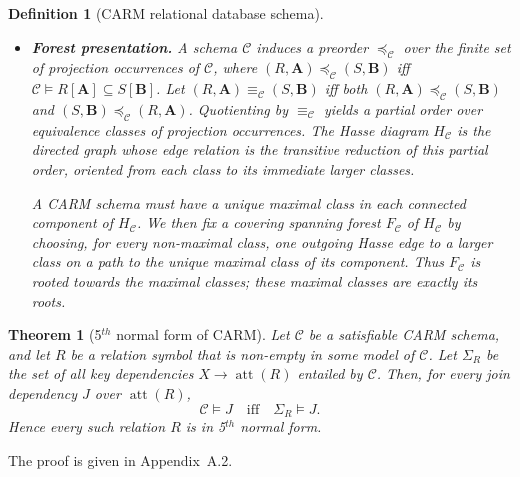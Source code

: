 \documentclass[10pt]{article}
\newtheorem{definition}{Definition}
\newtheorem{theorem}{Theorem}
\begin{document}
\begin{definition}[\textsf{CARM} relational database schema]
\begin{itemize}
\item \textbf{Forest presentation.}
A schema \(\mathcal C\) induces a preorder
\(\preceq_{\mathcal C}\) over the finite set of projection
occurrences of \(\mathcal C\), where
\((R,\mathbf A)\preceq_{\mathcal C}(S,\mathbf B)\) iff
\(\mathcal C\models R[\mathbf A]\subseteq S[\mathbf B]\).  Let
\((R,\mathbf A)\equiv_{\mathcal C}(S,\mathbf B)\) iff both
\((R,\mathbf A)\preceq_{\mathcal C}(S,\mathbf B)\) and
\((S,\mathbf B)\preceq_{\mathcal C}(R,\mathbf A)\).  Quotienting by
\(\equiv_{\mathcal C}\) yields a partial order over equivalence classes
of projection occurrences.  The Hasse diagram \(H_{\mathcal C}\) is the
directed graph whose edge relation is the transitive reduction of this
partial order, oriented from each class to its immediate larger classes.

A \textsf{CARM} schema must have a unique maximal class in each connected
component of \(H_{\mathcal C}\).  We then fix a covering spanning forest
\(F_{\mathcal C}\) of \(H_{\mathcal C}\) by choosing, for every
non-maximal class, one outgoing Hasse edge to a larger class on a path to
the unique maximal class of its component.  Thus \(F_{\mathcal C}\) is
rooted towards the maximal classes; these maximal classes are exactly its
roots.
\end{itemize}

\end{definition}

\begin{theorem}[5$^{th}$ normal form of \textsf{CARM}]
\label{lem:carm-5}
Let \(\mathcal C\) be a satisfiable \textsf{CARM} schema, and let \(R\)
be a relation symbol that is non-empty in some model of \(\mathcal C\).
Let \(\Sigma_R\) be the set of all key dependencies
\(X\to\operatorname{att}(R)\) entailed by \(\mathcal C\). Then, for every
join dependency \(J\) over \(\operatorname{att}(R)\),
\[
\mathcal C\models J
\quad\text{iff}\quad
\Sigma_R\models J .
\]
Hence every such relation \(R\) is in 5$^{th}$ normal form.
\end{theorem}

The proof is given in Appendix~A.2.
\end{document}

